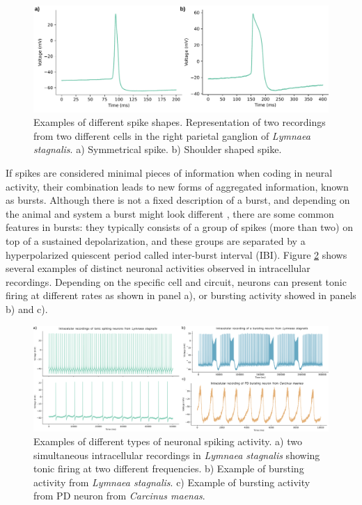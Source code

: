 \begin{figure}[htb!]
    \centering
    \includegraphics[width=\linewidth]{img/intro/spike-types.pdf}
    \caption{Examples of different spike shapes. Representation of two recordings from two different cells in the right parietal ganglion of \textit{Lymnaea stagnalis}. a) Symmetrical spike. b) Shoulder shaped spike.}
    \label{fig:spike-types}
\end{figure}

If spikes are considered minimal pieces of information when coding in neural activity, their combination leads to new forms of aggregated information, known as bursts. Although there is not a fixed description of a burst, and depending on the animal and system a burst might look different \parencite{russell_bursting_1978,palmu_detection_2010,lundqvist_gamma_2016}, there are some common features in bursts: they typically consists of a group of spikes (more than two) on top of a sustained depolarization, and these groups are separated by a hyperpolarized quiescent period called inter-burst interval (IBI). Figure \ref{fig:spike_activity-types} shows several examples of distinct neuronal activities observed in intracellular recordings. Depending on the specific cell and circuit, neurons can present tonic firing at different rates as shown in panel a), or bursting activity showed in panels b) and c). 

\begin{figure}[htb!]
    \centering
    \includegraphics[width=\linewidth]{img/intro/spike_activity-types.png}
    \caption{Examples of different types of neuronal spiking activity. a) two simultaneous intracellular recordings in \textit{Lymnaea stagnalis} showing tonic firing at two different frequencies. b) Example of bursting activity from \textit{Lymnaea stagnalis}. c) Example of bursting activity from PD neuron from \textit{Carcinus maenas}.}
    \label{fig:spike_activity-types}
\end{figure}


